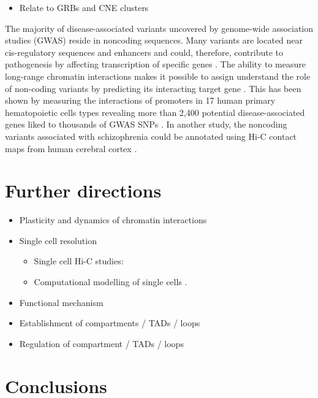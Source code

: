 \documentclass[a4paper,twoside=true,openright,parskip=full,chapterprefix=true,11pt,headings=normal,bibliography=totoc,listof=totoc,titlepage=on,captions=tableabove,draft=false]{scrreprt}
\providecommand{\tightlist}{%
  \setlength{\itemsep}{0pt}\setlength{\parskip}{0pt}}
\theoremstyle{definition}
\theoremstyle{definition}
\theoremstyle{definition}
\theoremstyle{remark}
\begin{document}
\begin{itemize}
\tightlist
\item
  Relate to GRBs and CNE clusters
  \citep{Harmston2017, Polychronopoulos2017}
\end{itemize}

The majority of disease-associated variants uncovered by genome-wide
association studies (GWAS) reside in noncoding sequences. Many variants
are located near cis-regulatory sequences and enhancers and could,
therefore, contribute to pathogenesis by affecting transcription of
specific genes \citep{Hindorff2009}. The ability to measure long-range
chromatin interactions makes it possible to assign understand the role
of non-coding variants by predicting its interacting target gene
\citep{Smemo2014, Visser2012}. This has been shown by measuring the
interactions of promoters in 17 human primary hematopoietic cells types
revealing more than 2,400 potential disease-associated genes liked to
thousands of GWAS SNPs \citep{Javierre2016}. In another study, the
noncoding variants associated with schizophrenia could be annotated
using Hi-C contact maps from human cerebral cortex \citep{Won2016}.

\hypertarget{further-directions}{%
\section{Further directions}\label{further-directions}}

\begin{itemize}
\tightlist
\item
  Plasticity and dynamics of chromatin interactions
\item
  Single cell resolution

  \begin{itemize}
  \tightlist
  \item
    Single cell Hi-C studies: \citep{Nagano2017, Stevens2017}
  \item
    Computational modelling of single cells \citep{Sekelja2016}.
  \end{itemize}
\item
  Functional mechanism
\item
  Establishment of compartments / TADs / loops
\item
  Regulation of compartment / TADs / loops
\end{itemize}

\hypertarget{conclusions}{%
\section{Conclusions}\label{conclusions}}
\end{document}
